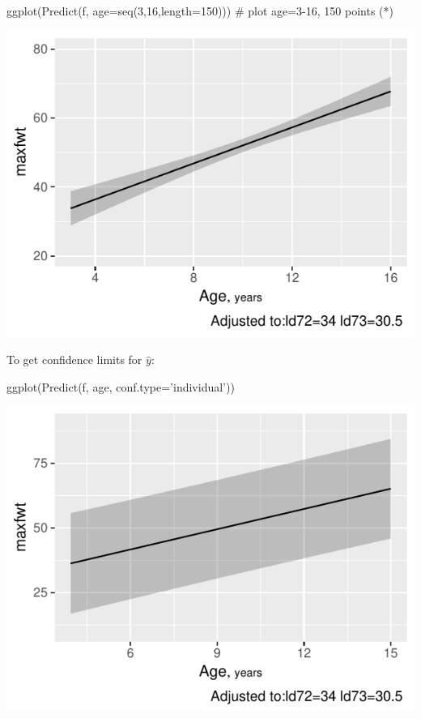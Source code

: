 \begin{Schunk}
\begin{Sinput}
ggplot(Predict(f, age=seq(3,16,length=150)))   # plot age=3-16, 150 points (*\ipacue*)
\end{Sinput}


\centerline{\includegraphics{rmsintro-unnamed-chunk-11-1} }

\end{Schunk}
\item To get confidence limits for $\hat{y}$: \ipacue
\begin{Schunk}
\begin{Sinput}
ggplot(Predict(f, age, conf.type='individual'))
\end{Sinput}


\centerline{\includegraphics{rmsintro-unnamed-chunk-12-1} }

\end{Schunk}
